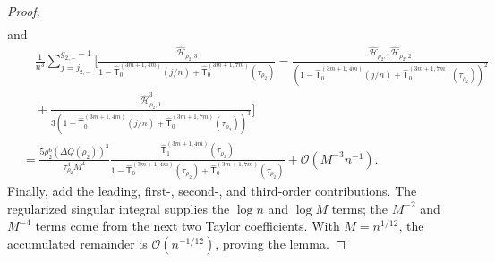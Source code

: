 \documentclass[a4paper]{article}
\numberwithin{equation}{section}
\begin{document}
\begin{proof}
\begin{align*}
\end{align*}
and 
\begin{align*}
&\quad 
\frac{1}{n^3}\sum_{j=j_{2,-}}^{g_{2,-}-1}
\bigg[
\frac{\widehat{\mathscr{H}}_{\rho_2,3}}{1-\widehat{\mathsf{T}}_0^{(3m+1,4m)}(j/n)+\widehat{\mathsf{T}}_0^{(3m+1,7m)}(\tau_{\rho_2})}
-\frac{\widehat{\mathscr{H}}_{\rho_2,1}\widehat{\mathscr{H}}_{\rho_2,2}}{(1-\widehat{\mathsf{T}}_0^{(3m+1,4m)}(j/n)+\widehat{\mathsf{T}}_0^{(3m+1,7m)}(\tau_{\rho_2}))^2}
\\
&\quad 
+\frac{\widehat{\mathscr{H}}_{\rho_2,1}^3}{3(1-\widehat{\mathsf{T}}_0^{(3m+1,4m)}(j/n)+\widehat{\mathsf{T}}_0^{(3m+1,7m)}(\tau_{\rho_2}))^3}
\bigg]
\\
&
=
\frac{5\rho_2^6(\Delta Q(\rho_2))^3}{\tau_{\rho_2}^4M^4}
\frac{\widehat{\mathsf{T}}_{1}^{(3m+1,4m)}(\tau_{\rho_2})}{1-\widehat{\mathsf{T}}_0^{(3m+1,4m)}(\tau_{\rho_2})+\widehat{\mathsf{T}}_0^{(3m+1,7m)}(\tau_{\rho_2})}
+\mathcal{O}(M^{-3}n^{-1}). 
\end{align*}
Finally, add the leading, first-, second-, and third-order contributions.  The
regularized singular integral supplies the $\log n$ and $\log M$ terms; the
$M^{-2}$ and $M^{-4}$ terms come from the next two Taylor coefficients.  With
$M=n^{1/12}$, the accumulated remainder is $\mathcal O(n^{-1/12})$, proving
the lemma.
\end{proof}
\end{document}
